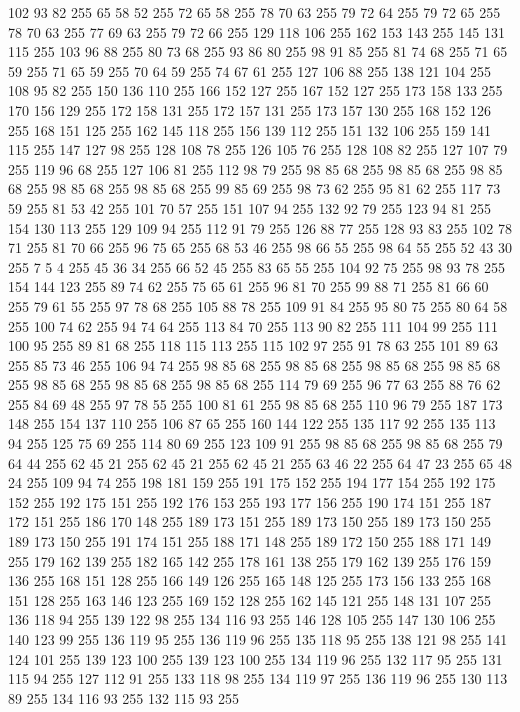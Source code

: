 102 93 82 255 65 58 52 255 72 65 58 255 78 70 63 255 79 72 64 255 79 72 65 255 78 70 63 255 77 69 63 255 79 72 66 255 129 118 106 255 162 153 143 255 145 131 115 255 103 96 88 255 80 73 68 255 93 86 80 255 98 91 85 255 81 74 68 255 71 65 59 255 71 65 59 255 70 64 59 255 74 67 61 255 127 106 88 255 138 121 104 255 108 95 82 255 150 136 110 255 166 152 127 255 167 152 127 255 173 158 133 255 170 156 129 255 172 158 131 255 172 157 131 255 173 157 130 255 168 152 126 255 168 151 125 255 162 145 118 255 156 139 112 255 151 132 106 255 159 141 115 255 147 127 98 255 128 108 78 255 126 105 76 255 128 108 82 255 127 107 79 255 119 96 68 255 127 106 81 255 112 98 79 255 98 85 68 255 98 85 68 255 98 85 68 255 98 85 68 255 98 85 68 255 99 85 69 255 98 73 62 255 95 81 62 255 117 73 59 255 81 53 42 255 101 70 57 255 151 107 94 255 132 92 79 255 123 94 81 255 154 130 113 255 129 109 94 255 112 91 79 255 126 88 77 255
128 93 83 255 102 78 71 255 81 70 66 255 96 75 65 255 68 53 46 255 98 66 55 255 98 64 55 255 52 43 30 255 7 5 4 255 45 36 34 255 66 52 45 255 83 65 55 255 104 92 75 255 98 93 78 255 154 144 123 255 89 74 62 255 75 65 61 255 96 81 70 255 99 88 71 255 81 66 60 255 79 61 55 255 97 78 68 255 105 88 78 255 109 91 84 255 95 80 75 255 80 64 58 255 100 74 62 255 94 74 64 255 113 84 70 255 113 90 82 255 111 104 99 255 111 100 95 255 89 81 68 255 118 115 113 255 115 102 97 255 91 78 63 255 101 89 63 255 85 73 46 255 106 94 74 255 98 85 68 255 98 85 68 255 98 85 68 255 98 85 68 255 98 85 68 255 98 85 68 255 98 85 68 255 114 79 69 255 96 77 63 255 88 76 62 255 84 69 48 255 97 78 55 255 100 81 61 255 98 85 68 255 110 96 79 255 187 173 148 255 154 137 110 255 106 87 65 255 160 144 122 255 135 117 92 255 135 113 94 255 125 75 69 255 114 80 69 255 123 109 91 255 98 85 68 255
98 85 68 255 79 64 44 255 62 45 21 255 62 45 21 255 62 45 21 255 63 46 22 255 64 47 23 255 65 48 24 255 109 94 74 255 198 181 159 255 191 175 152 255 194 177 154 255 192 175 152 255 192 175 151 255 192 176 153 255 193 177 156 255 190 174 151 255 187 172 151 255 186 170 148 255 189 173 151 255 189 173 150 255 189 173 150 255 189 173 150 255 191 174 151 255 188 171 148 255 189 172 150 255 188 171 149 255 179 162 139 255 182 165 142 255 178 161 138 255 179 162 139 255 176 159 136 255 168 151 128 255 166 149 126 255 165 148 125 255 173 156 133 255 168 151 128 255 163 146 123 255 169 152 128 255 162 145 121 255 148 131 107 255 136 118 94 255 139 122 98 255 134 116 93 255 146 128 105 255 147 130 106 255 140 123 99 255 136 119 95 255 136 119 96 255 135 118 95 255 138 121 98 255 141 124 101 255 139 123 100 255 139 123 100 255 134 119 96 255 132 117 95 255 131 115 94 255 127 112 91 255 133 118 98 255 134 119 97 255 136 119 96 255 130 113 89 255 134 116 93 255 132 115 93 255
